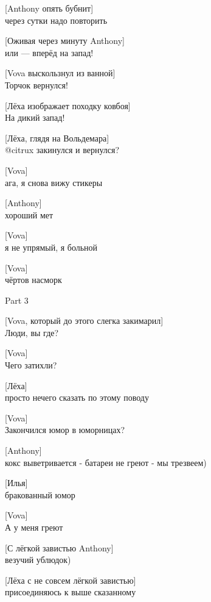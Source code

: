 [Anthony опять бубнит]\\
через сутки надо повторить


[Оживая через минуту Anthony]\\
или --- вперёд на запад!


[Vova выскользнул из ванной]\\
Торчок вернулся!


[Лёха изображает походку ковбоя]\\
На дикий запад!


[Лёха, глядя на Вольдемара]\\
@citrux закинулся и вернулся?


[Vova]\\
ага, я снова вижу стикеры


[Anthony]\\
хороший мет


[Vova]\\
я не упрямый, я больной


[Vova]\\
чёртов насморк


\begin{center}
\large Part 3
\end{center}

{\small{}}


{\small{}}


[Vova, который до этого слегка закимарил]\\
Люди, вы где?


[Vova]\\
Чего затихли?


[Лёха]\\
просто нечего сказать по этому поводу


[Vova]\\
Закончился юмор в юморницах?


[Anthony]\\
кокс выветривается - батареи не греют - мы трезвеем)


[Илья]\\
бракованный юмор


[Vova]\\
А у меня греют


[С лёгкой завистью Anthony]\\
везучий ублюдок)


[Лёха с не совсем лёгкой завистью]\\
присоединяюсь к выше сказанному


